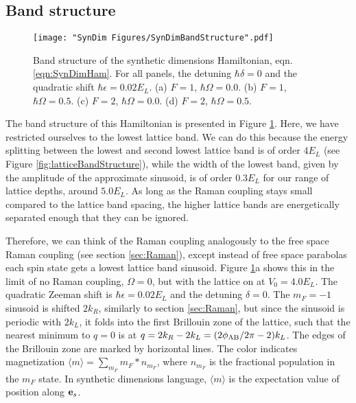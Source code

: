 \subsection{Band structure}\label{sec:SynDimBandStructure}
\begin{figure}
	\texttt{[image: "SynDim Figures/SynDimBandStructure".pdf]}
\caption[Band structure of the synthetic dimensions Hamiltonian]{Band structure of the synthetic dimensions Hamiltonian, eqn. \ref{eqn:SynDimHam}. For all panels, the detuning $\hbar\delta=0$ and the quadratic shift $\hbar\epsilon=0.02 E_L$. (a) $F=1$, $\hbar\Omega=0.0$. (b) $F=1$, $\hbar\Omega=0.5$. (c) $F=2$, $\hbar\Omega=0.0$. (d) $F=2$, $\hbar\Omega=0.5$. }
\label{fig:SynDimBandStruct}
\end{figure}

The band structure of this Hamiltonian is presented in Figure \ref{fig:SynDimBandStruct}. Here, we have restricted ourselves to the lowest lattice band. We can do this because the energy splitting between the lowest and second lowest lattice band is of order $4 E_L$ (see Figure \ref{fig:latticeBandStructure}), while the width of the lowest band, given by the amplitude of the approximate sinusoid, is of order $0.3 E_L$ for our range of lattice depths, around $5.0 E_L$. As long as the Raman coupling stays small compared to the lattice band spacing, the higher lattice bands are energetically separated enough that they can be ignored. 

Therefore, we can think of the Raman coupling analogously to the free space Raman coupling (see section \ref{sec:Raman}), except instead of free space parabolas each spin state gets a lowest lattice band sinusoid.   Figure \ref{fig:SynDimBandStruct}a shows this in the limit of no Raman coupling, $\Omega=0$, but with the lattice on at $V_0=4.0 E_L$. The quadratic Zeeman shift is $\hbar\epsilon=0.02 E_L$ and the detuning $\delta=0$. The $m_F=-1$ sinusoid is shifted $2k_R$, similarly to section \ref{sec:Raman}, but since the sinusoid is periodic with $2k_L$, it folds into the first Brillouin zone of the lattice, such that the nearest minimum to $q=0$ is at $q = 2k_R-2k_L = (2\phi_{\rm AB}/2\pi - 2)k_L$. The edges of the Brillouin zone are marked by horizontal lines. The color indicates magnetization $\langle m\rangle=\sum_{m_F}m_F*n_{m_F}$, where $n_{m_F}$ is the fractional population in the $m_F$ state. In synthetic dimensions language, $\langle m \rangle$ is the expectation value of position along ${\bf e}_s$.

